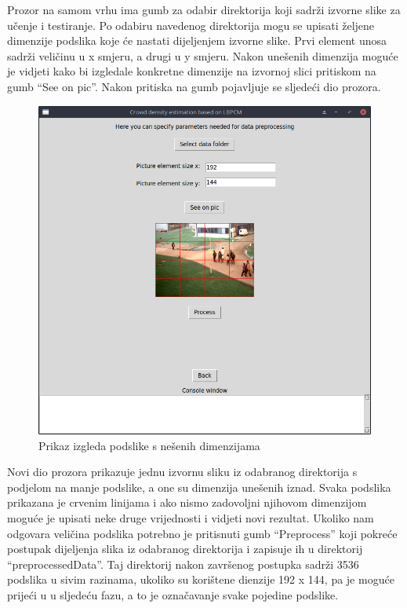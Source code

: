 \documentclass[times, utf8, zavrsni]{fer}
\begin{document}
\bigbreak

Prozor na samom vrhu ima gumb za odabir direktorija koji sadrži izvorne slike
za učenje i testiranje. Po odabiru navedenog direktorija mogu se upisati 
željene dimenzije podslika koje će nastati dijeljenjem izvorne slike.
Prvi element unosa sadrži veličinu u x smjeru, a drugi u y smjeru. Nakon
unešenih dimenzija moguće je vidjeti kako bi izgledale konkretne dimenzije
na izvornoj slici pritiskom na gumb \enquote{See on pic}. Nakon pritiska na gumb
pojavljuje se sljedeći dio prozora.

\begin{figure}[ht]
\centering
\includegraphics[scale=0.4]{img/seeonpic.png}
\caption{Prikaz izgleda podslike s nešenih dimenzijama}
\end{figure}

Novi dio prozora prikazuje jednu izvornu sliku iz odabranog direktorija
s podjelom na manje podslike, a one su dimenzija unešenih iznad. Svaka podslika
prikazana je crvenim linijama i ako nismo zadovoljni njihovom dimenzijom
moguće je upisati neke druge vrijednosti i vidjeti novi rezultat. Ukoliko 
nam odgovara veličina podslika potrebno je pritisnuti gumb \enquote{Preprocess}
koji pokreće postupak dijeljenja slika iz odabranog direktorija i zapisuje ih u 
direktorij \enquote{preprocessedData}. Taj direktorij nakon završenog postupka
sadrži 3536 podslika u sivim razinama, ukoliko su korištene dienzije 192 x 144, 
pa je moguće prijeći u u sljedeću fazu, a to je označavanje svake pojedine podslike.
\end{document}
